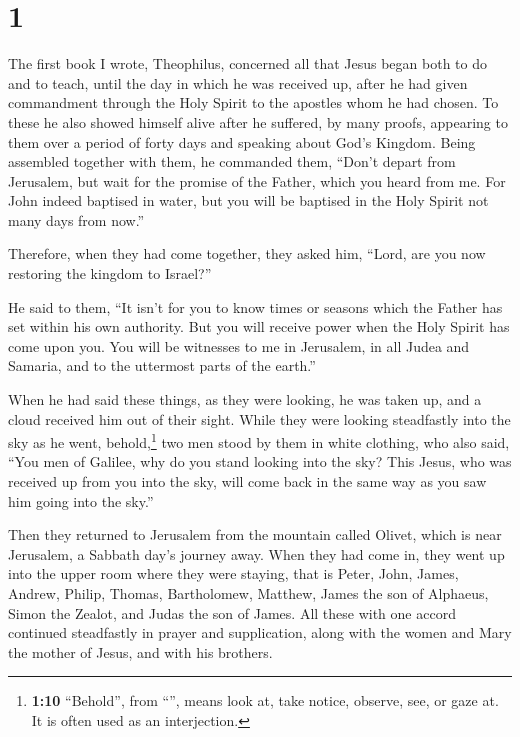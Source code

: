 \hypertarget{section}{%
\section{1}\label{section}}

 The first book I wrote, Theophilus, concerned all that
Jesus began both to do and to teach,  until the day in
which he was received up, after he had given commandment through the
Holy Spirit to the apostles whom he had chosen.  To these
he also showed himself alive after he suffered, by many proofs,
appearing to them over a period of forty days and speaking about God's
Kingdom.  Being assembled together with them, he commanded
them, ``Don't depart from Jerusalem, but wait for the promise of the
Father, which you heard from me.  For John indeed baptised
in water, but you will be baptised in the Holy Spirit not many days from
now.''

 Therefore, when they had come together, they asked him,
``Lord, are you now restoring the kingdom to Israel?''

 He said to them, ``It isn't for you to know times or
seasons which the Father has set within his own authority.
 But you will receive power when the Holy Spirit has come
upon you. You will be witnesses to me in Jerusalem, in all Judea and
Samaria, and to the uttermost parts of the earth.''

 When he had said these things, as they were looking, he
was taken up, and a cloud received him out of their sight.
 While they were looking steadfastly into the sky as he
went, behold,\footnote{\textbf{1:10} ``Behold'', from ``'',
  means look at, take notice, observe, see, or gaze at. It is often used
  as an interjection.} two men stood by them in white clothing,
 who also said, ``You men of Galilee, why do you stand
looking into the sky? This Jesus, who was received up from you into the
sky, will come back in the same way as you saw him going into the sky.''

 Then they returned to Jerusalem from the mountain called
Olivet, which is near Jerusalem, a Sabbath day's journey away.
 When they had come in, they went up into the upper room
where they were staying, that is Peter, John, James, Andrew, Philip,
Thomas, Bartholomew, Matthew, James the son of Alphaeus, Simon the
Zealot, and Judas the son of James.  All these with one
accord continued steadfastly in prayer and supplication, along with the
women and Mary the mother of Jesus, and with his brothers.


